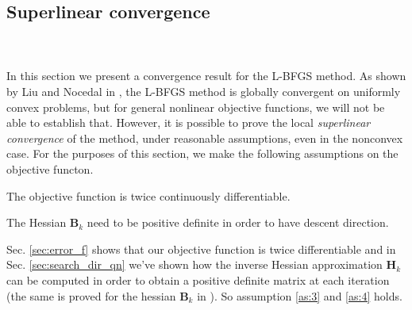 \subsection{Superlinear convergence}\label{superlinear_convergence_qn}
\\
\\
In this section we present a convergence result for the L-BFGS method. As shown by Liu and Nocedal in \cite{Liu}, the L-BFGS method is globally convergent on uniformly convex problems,  but for general nonlinear objective functions, we will not be able to establish that. However, it is possible to prove the local \emph{superlinear convergence} of the method, under reasonable assumptions, even in the nonconvex case. For the purposes of this section, we make the following assumptions on the objective functon.
\begin{assumption}
\label{as:3}
The objective function is twice continuously differentiable. 
\end{assumption}
\begin{assumption}
\label{as:4}
The Hessian $\mathbf{B}_k$ need to be positive definite in order to have descent direction.
\end{assumption}

\noindent Sec. \ref{sec:error_f} shows that our objective function is twice differentiable and in Sec. \ref{sec:search_dir_qn} we've shown how the inverse Hessian approximation $\mathbf{H}_k$ can be computed in order to obtain a positive definite matrix at each iteration (the same is proved for the hessian $\mathbf{B}_k$ in \cite{Nocedal}). So assumption \ref{as:3} and \ref{as:4} holds.\\

